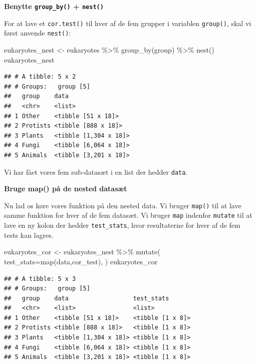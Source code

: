 \documentclass[
]{book}
\newenvironment{Shaded}{\begin{snugshade}}{\end{snugshade}}
\newcommand{\AttributeTok}[1]{\textcolor[rgb]{0.77,0.63,0.00}{#1}}
\newcommand{\FunctionTok}[1]{\textcolor[rgb]{0.00,0.00,0.00}{#1}}
\newcommand{\NormalTok}[1]{#1}
\newcommand{\OtherTok}[1]{\textcolor[rgb]{0.56,0.35,0.01}{#1}}
\newcommand{\SpecialCharTok}[1]{\textcolor[rgb]{0.00,0.00,0.00}{#1}}
\begin{document}
\textbf{Benytte \texttt{group\_by()} + \texttt{nest()}}

For at lave et \texttt{cor.test()} til hver af de fem grupper i variablen \texttt{group()}, skal vi først anvende \texttt{nest()}:

\begin{Shaded}
\begin{Highlighting}[]
\NormalTok{eukaryotes\_nest }\OtherTok{\textless{}{-}}\NormalTok{ eukaryotes }\SpecialCharTok{\%\textgreater{}\%} 
  \FunctionTok{group\_by}\NormalTok{(group) }\SpecialCharTok{\%\textgreater{}\%} 
  \FunctionTok{nest}\NormalTok{()}
\NormalTok{eukaryotes\_nest}
\end{Highlighting}
\end{Shaded}

\begin{verbatim}
## # A tibble: 5 x 2
## # Groups:   group [5]
##   group    data                 
##   <chr>    <list>               
## 1 Other    <tibble [51 x 18]>   
## 2 Protists <tibble [888 x 18]>  
## 3 Plants   <tibble [1,304 x 18]>
## 4 Fungi    <tibble [6,064 x 18]>
## 5 Animals  <tibble [3,201 x 18]>
\end{verbatim}

Vi har fået vores fem sub-datasæt i en list der hedder \texttt{data}.

\textbf{Bruge map() på de nested datasæt}

Nu lad os køre vores funktion på den nested data. Vi bruger \texttt{map()} til at lave samme funktion for hver af de fem datasæt. Vi bruger \texttt{map} indenfor \texttt{mutate} til at lave en ny kolon der hedder \texttt{test\_stats}, hvor resultaterne for hver af de fem tests kan lagres.

\begin{Shaded}
\begin{Highlighting}[]
\NormalTok{eukaryotes\_cor }\OtherTok{\textless{}{-}}\NormalTok{ eukaryotes\_nest }\SpecialCharTok{\%\textgreater{}\%} 
  \FunctionTok{mutate}\NormalTok{(}
    \AttributeTok{test\_stats=}\FunctionTok{map}\NormalTok{(data,cor\_test),}
\NormalTok{    )}
\NormalTok{eukaryotes\_cor}
\end{Highlighting}
\end{Shaded}

\begin{verbatim}
## # A tibble: 5 x 3
## # Groups:   group [5]
##   group    data                  test_stats      
##   <chr>    <list>                <list>          
## 1 Other    <tibble [51 x 18]>    <tibble [1 x 8]>
## 2 Protists <tibble [888 x 18]>   <tibble [1 x 8]>
## 3 Plants   <tibble [1,304 x 18]> <tibble [1 x 8]>
## 4 Fungi    <tibble [6,064 x 18]> <tibble [1 x 8]>
## 5 Animals  <tibble [3,201 x 18]> <tibble [1 x 8]>
\end{verbatim}
\end{document}
